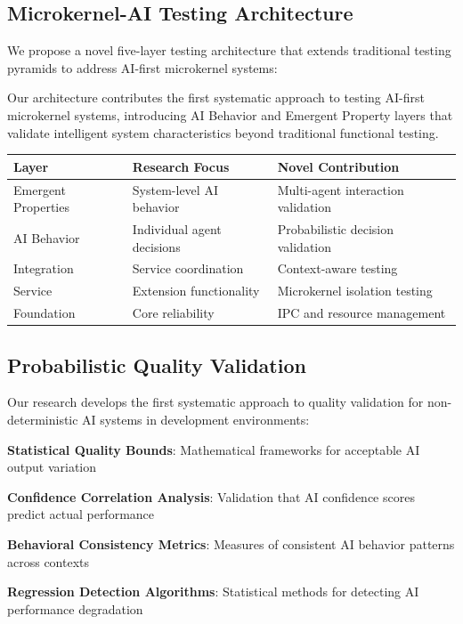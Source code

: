 \subsection*{Microkernel-AI Testing Architecture}

We propose a novel five-layer testing architecture that extends traditional testing pyramids to address AI-first microkernel systems:

\begin{infobox}[title=Novel Testing Architecture]
Our architecture contributes the first systematic approach to testing AI-first microkernel systems, introducing AI Behavior and Emergent Property layers that validate intelligent system characteristics beyond traditional functional testing.
\end{infobox}

\begin{center}
\begin{tabular}{@{}lll@{}}
\toprule
\textbf{Layer} & \textbf{Research Focus} & \textbf{Novel Contribution} \\
\midrule
Emergent Properties & System-level AI behavior & Multi-agent interaction validation \\
AI Behavior & Individual agent decisions & Probabilistic decision validation \\
Integration & Service coordination & Context-aware testing \\
Service & Extension functionality & Microkernel isolation testing \\
Foundation & Core reliability & IPC and resource management \\
\bottomrule
\end{tabular}
\end{center}

\subsection*{Probabilistic Quality Validation}

Our research develops the first systematic approach to quality validation for non-deterministic AI systems in development environments:

\begin{compactlist}
    \item \textbf{Statistical Quality Bounds}: Mathematical frameworks for acceptable AI output variation
    \item \textbf{Confidence Correlation Analysis}: Validation that AI confidence scores predict actual performance
    \item \textbf{Behavioral Consistency Metrics}: Measures of consistent AI behavior patterns across contexts
    \item \textbf{Regression Detection Algorithms}: Statistical methods for detecting AI performance degradation
\end{compactlist}

